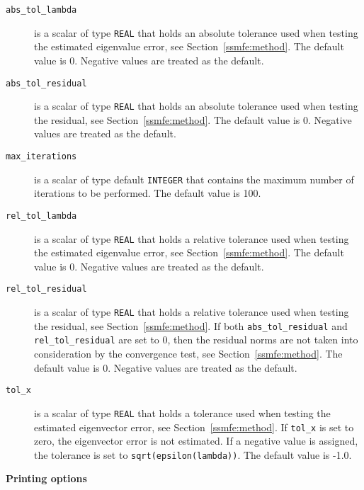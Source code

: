 \begin{description}
%
\item[\texttt{abs\_tol\_lambda}] is a scalar of type
\texttt{REAL} that
holds an absolute tolerance used when testing the estimated eigenvalue 
error, see Section~\ref{ssmfe:method}. 
The default value is 0.
Negative values are treated as the default.
%
\item[\texttt{abs\_tol\_residual}] is a scalar of type \texttt{REAL} that
holds an absolute tolerance used when testing the residual, 
see Section~\ref{ssmfe:method}.
The default value is 0.
Negative values are treated as the default.
%
\item[\texttt{max\_iterations}] is a scalar of type default \texttt{INTEGER} that
contains the maximum number of iterations to be performed.
The default value is 100.
%
\item[\texttt{rel\_tol\_lambda}] is a scalar of type \texttt{REAL} that
holds a relative tolerance used when testing the estimated eigenvalue 
error, see Section~\ref{ssmfe:method}. 
The default value is 0. 
Negative values are treated as the default.
%
\item[\texttt{rel\_tol\_residual}] is a scalar of type \texttt{REAL} that
holds a relative tolerance used when testing the residual,
see Section~\ref{ssmfe:method}. 
If both {\tt abs\_tol\_residual} and {\tt rel\_tol\_residual}
are set to 0, then the residual norms are not taken
into consideration by the convergence test,
see Section~\ref{ssmfe:method}.
The default value is 0.
Negative values are treated as the default.
%
\item[\texttt{tol\_x}] is a scalar of type \texttt{REAL} that
holds a tolerance used when testing the estimated 
eigenvector error, see Section~\ref{ssmfe:method}. 
If {\tt tol\_x} is set to zero, the eigenvector error is not estimated.
If a negative value is assigned, the tolerance is set to
{\tt sqrt(epsilon(lambda))}.
The default value is -1.0.
%
\end{description}

\medskip
\noindent
{\bf Printing options}

